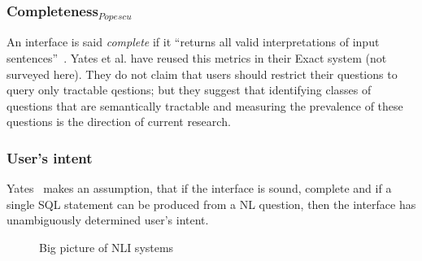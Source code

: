 \documentclass[10pt,journal,letterpaper,compsoc]{IEEEtran}
\begin{document}
\subsubsection{Completeness$_{Popescu}$}
An interface is said {\it complete} if it ``returns all valid interpretations of
input sentences''~\cite{Yates:2003:RNL:604045.604075}.
Yates et al. have reused this metrics in their {\sc Exact} system (not surveyed
here). They do not claim that users should restrict their questions to query
only tractable qestions; but they suggest that identifying classes of questions
that are semantically tractable and measuring the prevalence of these questions
is the direction of current research.


\subsubsection{User's intent}
Yates~\cite{Yates:2003:RNL:604045.604075} makes an assumption, that if the
interface is sound, complete and if a single SQL statement can be produced from
a NL question, then the interface has unambiguously determined user's intent. 

\begin{figure}
\centering
{}
\caption{Big picture of NLI systems}
\label{fig:big-picture}
\end{figure}
\end{document}
